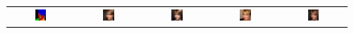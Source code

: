 \begin{figure}[]
\begin{tabular} {cc|cc|c}
\includegraphics[width=0.1932\textwidth]{Images/Rec/Faces/label/28053.png} & \includegraphics[width=0.1932\textwidth]{Images/Rec/Faces/gt/28053.jpg} &
\includegraphics[width=0.1932\textwidth]{Images/Rec/Faces/pix2pixhd/28053.jpg} &   \includegraphics[width=0.1932\textwidth]{Images/Rec/Faces/spade/28053.jpg} &  \includegraphics[width=0.1932\textwidth]{Images/Rec/Faces/ours/28053.png} \\


\end{tabular}
\end{figure}
